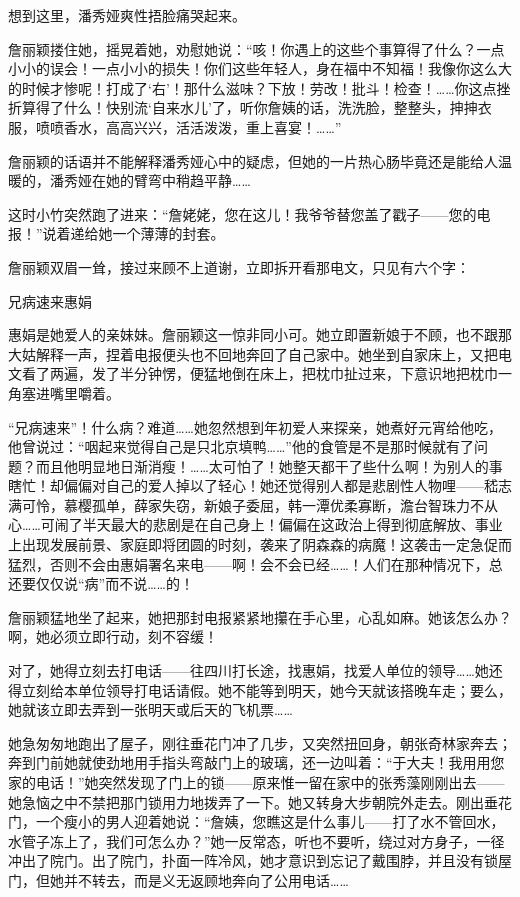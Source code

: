 \par 想到这里，潘秀娅爽性捂脸痛哭起来。
\par 詹丽颖搂住她，摇晃着她，劝慰她说：“咳！你遇上的这些个事算得了什么？一点小小的误会！一点小小的损失！你们这些年轻人，身在福中不知福！我像你这么大的时候才惨呢！打成了‘右’！那什么滋味？下放！劳改！批斗！检查！……你这点挫折算得了什么！快别流‘自来水儿’了，听你詹姨的话，洗洗脸，整整头，抻抻衣服，喷喷香水，高高兴兴，活活泼泼，重上喜宴！……”
\par 詹丽颖的话语并不能解释潘秀娅心中的疑虑，但她的一片热心肠毕竟还是能给人温暖的，潘秀娅在她的臂弯中稍趋平静……
\par 这时小竹突然跑了进来：“詹姥姥，您在这儿！我爷爷替您盖了戳子——您的电报！”说着递给她一个薄薄的封套。
\par 詹丽颖双眉一耸，接过来顾不上道谢，立即拆开看那电文，只见有六个字：
\par 兄病速来惠娟
\par 惠娟是她爱人的亲妹妹。詹丽颖这一惊非同小可。她立即置新娘于不顾，也不跟那大姑解释一声，捏着电报便头也不回地奔回了自己家中。她坐到自家床上，又把电文看了两遍，发了半分钟愣，便猛地倒在床上，把枕巾扯过来，下意识地把枕巾一角塞进嘴里嚼着。
\par “兄病速来”！什么病？难道……她忽然想到年初爱人来探亲，她煮好元宵给他吃，他曾说过：“咽起来觉得自己是只北京填鸭……”他的食管是不是那时候就有了问题？而且他明显地日渐消瘦！……太可怕了！她整天都干了些什么啊！为别人的事瞎忙！却偏偏对自己的爱人掉以了轻心！她还觉得别人都是悲剧性人物哩——嵇志满可怜，慕樱孤单，薛家失窃，新娘子委屈，韩一潭优柔寡断，澹台智珠力不从心……可闹了半天最大的悲剧是在自己身上！偏偏在这政治上得到彻底解放、事业上出现发展前景、家庭即将团圆的时刻，袭来了阴森森的病魔！这袭击一定急促而猛烈，否则不会由惠娟署名来电——啊！会不会已经……！人们在那种情况下，总还要仅仅说“病”而不说……的！
\par 詹丽颖猛地坐了起来，她把那封电报紧紧地攥在手心里，心乱如麻。她该怎么办？啊，她必须立即行动，刻不容缓！
\par 对了，她得立刻去打电话——往四川打长途，找惠娟，找爱人单位的领导……她还得立刻给本单位领导打电话请假。她不能等到明天，她今天就该搭晚车走；要么，她就该立即去弄到一张明天或后天的飞机票……
\par 她急匆匆地跑出了屋子，刚往垂花门冲了几步，又突然扭回身，朝张奇林家奔去；奔到门前她就使劲地用手指头弯敲门上的玻璃，还一边叫着：“于大夫！我用用您家的电话！”她突然发现了门上的锁——原来惟一留在家中的张秀藻刚刚出去——她急恼之中不禁把那门锁用力地拨弄了一下。她又转身大步朝院外走去。刚出垂花门，一个瘦小的男人迎着她说：“詹姨，您瞧这是什么事儿——打了水不管回水，水管子冻上了，我们可怎么办？”她一反常态，听也不要听，绕过对方身子，一径冲出了院门。出了院门，扑面一阵冷风，她才意识到忘记了戴围脖，并且没有锁屋门，但她并不转去，而是义无返顾地奔向了公用电话……
